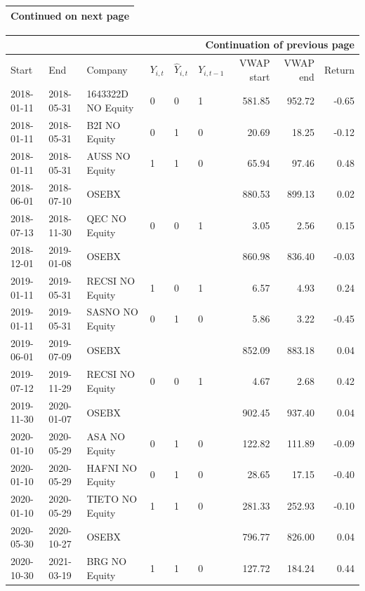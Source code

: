 \begin{appendices}
\begin{table}[h]
\begin{tabular}{llllllrrr}
 
    \midrule \multicolumn{9}{r}{{Continued on next page}} \\
   \hline
\end{tabular}
   
\end{table}



\begin{table}[H]
\centering
\scriptsize
\begin{tabular}{llllllrrr}
 \midrule \multicolumn{9}{r}{{Continuation of previous page}} \\
  \hline
Start & End & Company & $Y_{i,t}$ & $\widehat Y_{i,t}$ & $Y_{i,t-1}$ & VWAP start & VWAP end & Return \\ 
  \hline 
   2018-01-11 & 2018-05-31 & 1643322D NO Equity & 0 & 0 & 1 & 581.85 & 952.72 & -0.65 \\ 
   2018-01-11 & 2018-05-31 & B2I NO Equity & 0 & 1 & 0 & 20.69 & 18.25 & -0.12 \\ 
   2018-01-11 & 2018-05-31 & AUSS NO Equity & 1 & 1 & 0 & 65.94 & 97.46 & 0.48 \\ 
   2018-06-01 & 2018-07-10 & OSEBX &  &  &  & 880.53 & 899.13 & 0.02 \\ 
   2018-07-13 & 2018-11-30 & QEC NO Equity & 0 & 0 & 1 & 3.05 & 2.56 & 0.15 \\ 
   2018-12-01 & 2019-01-08 & OSEBX &  &  &  & 860.98 & 836.40 & -0.03 \\ 
   2019-01-11 & 2019-05-31 & RECSI NO Equity & 1 & 0 & 1 & 6.57 & 4.93 & 0.24 \\ 
   2019-01-11 & 2019-05-31 & SASNO NO Equity & 0 & 1 & 0 & 5.86 & 3.22 & -0.45 \\ 
   2019-06-01 & 2019-07-09 & OSEBX &  &  &  & 852.09 & 883.18 & 0.04 \\ 
   2019-07-12 & 2019-11-29 & RECSI NO Equity & 0 & 0 & 1 & 4.67 & 2.68 & 0.42 \\ 
   2019-11-30 & 2020-01-07 & OSEBX &  &  &  & 902.45 & 937.40 & 0.04 \\ 
   2020-01-10 & 2020-05-29 & ASA NO Equity & 0 & 1 & 0 & 122.82 & 111.89 & -0.09 \\ 
   2020-01-10 & 2020-05-29 & HAFNI NO Equity & 0 & 1 & 0 & 28.65 & 17.15 & -0.40 \\ 
   2020-01-10 & 2020-05-29 & TIETO NO Equity & 1 & 1 & 0 & 281.33 & 252.93 & -0.10 \\ 
   2020-05-30 & 2020-10-27 & OSEBX &  &  &  & 796.77 & 826.00 & 0.04 \\ 
   2020-10-30 & 2021-03-19 & BRG NO Equity & 1 & 1 & 0 & 127.72 & 184.24 & 0.44 \\ 

\end{tabular}
\end{table}
\end{appendices}
